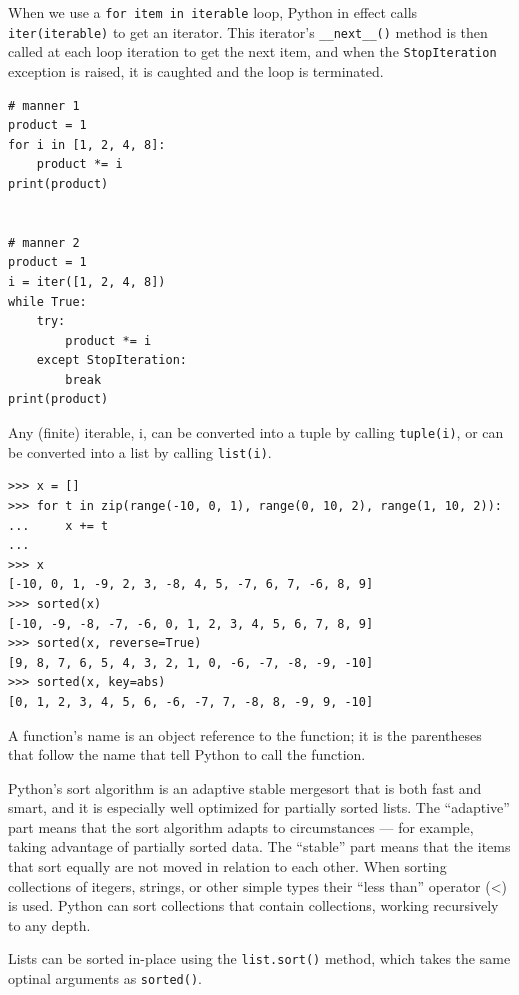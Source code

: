 When we use a \verb|for item in iterable| loop, Python in effect calls \verb|iter(iterable)| to get an iterator.
This iterator's \verb|__next__()| method is then called at each loop iteration to get the next item, and when the \verb|StopIteration| exception is raised, it is caughted and the loop is terminated.



\begin{lstlisting}
# manner 1
product = 1
for i in [1, 2, 4, 8]:
    product *= i
print(product)


# manner 2
product = 1
i = iter([1, 2, 4, 8])
while True:
    try:
        product *= i
    except StopIteration:
        break
print(product)  
\end{lstlisting}



Any (finite) iterable, i, can be converted into a tuple by calling \verb|tuple(i)|, or can be converted into a list by calling \verb|list(i)|.




\begin{lstlisting}
>>> x = []
>>> for t in zip(range(-10, 0, 1), range(0, 10, 2), range(1, 10, 2)):
...     x += t
... 
>>> x
[-10, 0, 1, -9, 2, 3, -8, 4, 5, -7, 6, 7, -6, 8, 9]
>>> sorted(x)
[-10, -9, -8, -7, -6, 0, 1, 2, 3, 4, 5, 6, 7, 8, 9]
>>> sorted(x, reverse=True)
[9, 8, 7, 6, 5, 4, 3, 2, 1, 0, -6, -7, -8, -9, -10]
>>> sorted(x, key=abs)
[0, 1, 2, 3, 4, 5, 6, -6, -7, 7, -8, 8, -9, 9, -10]  
\end{lstlisting}


\begin{tcolorbox}
  A function's name is an object reference to the function;
  it is the parentheses that follow the name that tell Python to call the function.
\end{tcolorbox}


Python's sort algorithm is an adaptive stable mergesort that is both fast and smart, and it is especially well optimized for partially sorted lists.
The ``adaptive'' part means that the sort algorithm adapts to circumstances --- for example, taking advantage of partially sorted data.
The ``stable'' part means that the items that sort equally are not moved in relation to each other.
When sorting collections of itegers, strings, or other simple types their ``less than'' operator (<) is used.
Python can sort collections that contain collections, working recursively to any depth.



Lists can be sorted in-place using the \verb|list.sort()| method, which takes the same optinal arguments as \verb|sorted()|.


